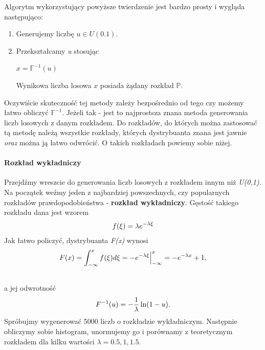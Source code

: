 \documentclass[a4paper,12pt,polish]{sphinxmanual}
\begin{document}
Algorytm wykorzystujący powyższe twierdzenie jest bardzo prosty i wygląda następująco:
\begin{enumerate}
\item {} 
Generujemy liczbę $u \in U(0.1)$.

\item {} 
Przekształcamy \emph{u} stosując

$x = \mathbb{F}^{-1}(u)$

Wynikowa liczba losowa $x$ posiada żądany rozkład $\mathbb{P}$.

\end{enumerate}

Oczywiście skuteczność tej metody zależy bezpośrednio od tego czy możemy łatwo obliczyć $\mathbb{F}^{-1}$.
Jeżeli tak - jest to najprostsza znana metoda generowania liczb losowych z danym rozkładem. Do rozkładów,
do których można zastosować tą metodę należą wszystkie rozkłady, których dystrybuanta znana jest jawnie \emph{oraz}
można ją łatwo odwrócić. O takich rozkładach powiemy sobie niżej.


\paragraph{Rozkład wykładniczy}
\label{ch5/chV011:rozklad-wykladniczy}
Przejdźmy wreszcie do generowania liczb losowych z rozkładem innym niż \emph{U(0,1)}. Na początek weźmy jeden
z najbardziej powszechnych, czy popularnych rozkładów prawdopodobieństwa - \textbf{rozkład wykładniczy}. Gęstość
takiego rozkładu dana jest wzorem
\begin{gather}
\begin{split}f(\xi) = \lambda e^{-\lambda \xi}\end{split}\notag
\end{gather}
Jak łatwo policzyć, dystrybuanta \emph{F(x)} wynosi
\begin{gather}
\begin{split}F(x) = \int_{-\infty}^x f(\xi) d\xi = -e^{-\lambda \xi}\Big|_{-\infty}^x = -e^{-\lambda x} + 1,\end{split}\notag\\\begin{split}\end{split}\notag
\end{gather}
a jej odwrotność
\begin{gather}
\begin{split}F^{-1}(u) = -\frac{1}{\lambda} \ln (1-u).\end{split}\notag
\end{gather}
Spróbujmy wygenerować 5000 liczb o rozkładzie wykładniczym. Następnie obliczymy sobie histogram, unormujemy
go i porównamy z teoretycznym rozkładem dla kilku wartości $\lambda = 0.5, 1, 1.5$.
\end{document}

